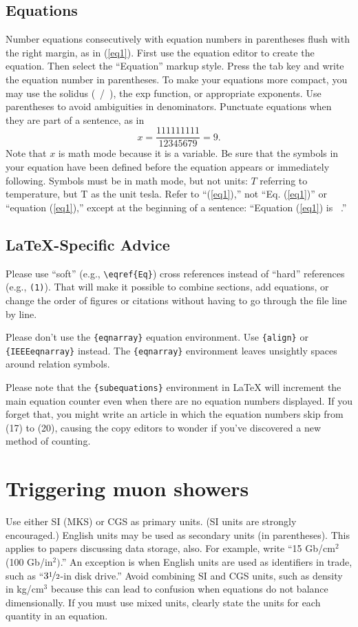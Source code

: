 \documentclass{IEEEtran}
\begin{document}
\subsection{Equations}
Number equations consecutively with equation numbers in parentheses flush
with the right margin, as in (\ref{eq1}). First use the equation editor to create
the equation. Then select the ``Equation'' markup style. Press the tab key
and write the equation number in parentheses. To make your equations more
compact, you may use the solidus (~/~), the exp function, or appropriate
exponents. Use parentheses to avoid ambiguities in denominators. Punctuate
equations when they are part of a sentence, as in
\begin{equation}
\label{eq1}
x=\frac{111111111}{12345679}=9 .
\end{equation}
Note that $x$ is math mode because it is a variable. Be sure that the symbols
in your equation have been defined before the equation appears or
immediately following. Symbols must be in math mode, but not units: $T$ referring to
temperature, but T as the unit tesla. Refer to ``(\ref{eq1}),'' not ``Eq. (\ref{eq1})'' or
``equation (\ref{eq1}),'' except at the beginning of a sentence: ``Equation (\ref{eq1}) is
{\textellipsis}~.''

\subsection{\LaTeX-Specific Advice}

Please use ``soft'' (e.g., \verb|\eqref{Eq}|) cross references instead
of ``hard'' references (e.g., \verb|(1)|). That will make it possible
to combine sections, add equations, or change the order of figures or
citations without having to go through the file line by line.

Please don't use the \verb|{eqnarray}| equation environment. Use
\verb|{align}| or \verb|{IEEEeqnarray}| instead. The \verb|{eqnarray}|
environment leaves unsightly spaces around relation symbols.

Please note that the \verb|{subequations}| environment in {\LaTeX}
will increment the main equation counter even when there are no
equation numbers displayed. If you forget that, you might write an
article in which the equation numbers skip from (17) to (20), causing
the copy editors to wonder if you've discovered a new method of
counting.

\section{Triggering muon showers}
Use either SI (MKS) or CGS as primary units. (SI units are strongly
encouraged.) English units may be used as secondary units (in
parentheses). This applies to papers discussing data storage, also.
For example, write ``15 Gb/cm$^{2}$ (100 Gb/in$^{2})$.'' An exception
is when English units are used as identifiers in trade, such as
``$3\nicefrac{1}{2}$-in disk drive.'' Avoid combining SI and CGS units,
such as density in kg/cm$^{3}$ because this can lead to confusion when
equations do not balance dimensionally. If you must use mixed units,
clearly state the units for each quantity in an equation.
\end{document}
